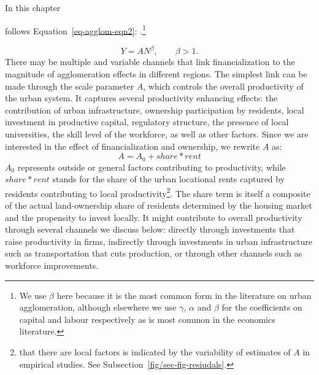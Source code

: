 In this chapter


follows Equation~\ref{eq-agglom-eqn2}: \cite{loboUrbanScalingProduction2013}.\footnote{We use $\beta$ here because it is the most common form in the literature on urban agglomeration, although elsewhere we use $\gamma$, $\alpha$ and $\beta$ for the coefficients on capital and labour respectively as is most common in the economics literature.}

\begin{equation}\label{eq-agglom-eqn2}
    Y=AN^\beta,\qquad \beta>1. 
\end{equation}
There may be multiple and variable channels that link financialization to the magnitude of agglomeration effects in different regions. 
The simplest link can be made through the scale parameter $A$, which controls the overall productivity of the urban system. It captures several productivity enhancing effects: the contribution of urban infrastructure, ownership participation by residents, local investment in productive capital, regulatory structure, the presence of local universities, the skill level of the workforce, as well as other factors. 
Since we are interested in the effect of financialization and ownership, we rewrite $A$ as:
\[ A= A_0 + share * rent\]
$A_0$ represents outside or general factors contributing to productivity, while $share*rent$ stands for the share of the urban locational rents captured by residents contributing to local productivity\footnote{that there are local factors is indicated by the variability of estimates of $A$ in empirical studies. See Subsection~\ref{fig/sec-fig-resiudals}.}. The share term is itself a composite of the actual land-ownership share of residents determined by the housing market and the propensity to invest locally.  It might contribute to overall productivity through several channels we discuss below:  directly through investments that raise productivity in firms, indirectly through investments in urban infrastructure such as transportation that cuts production, or through other channels such as workforce improvements. 


 





